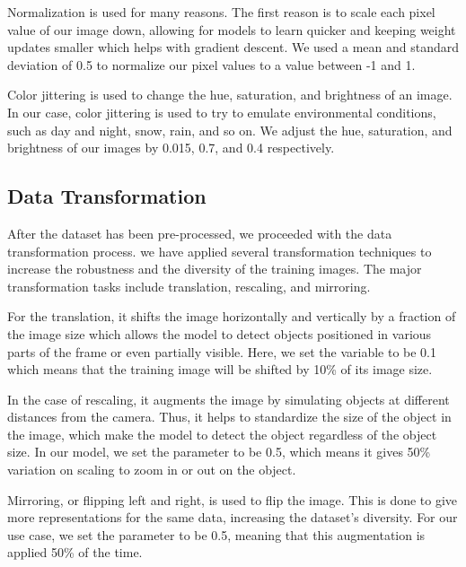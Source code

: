 \documentclass[stu,12pt,floatsintext]{apa7}
\begin{document}
Normalization is used for many reasons. The first reason is to scale each pixel value of our image down, allowing for models to learn quicker and keeping weight updates smaller which helps with gradient descent. We used a mean and standard deviation of 0.5 to normalize our pixel values to a value between -1 and 1.

Color jittering is used to change the hue, saturation, and brightness of an image. In our case, color jittering is used to try to emulate environmental conditions, such as day and night, snow, rain, and so on. We adjust the hue, saturation, and brightness of our images by 0.015, 0.7, and 0.4 respectively.



\subsection{Data Transformation}
After the dataset has been pre-processed, we proceeded with the data transformation process. we have applied several transformation techniques to increase the robustness and the diversity of the training images. The major transformation tasks include translation, rescaling, and mirroring.

For the translation, it shifts the image horizontally and vertically by a fraction of the image size which allows the model to detect objects positioned in various parts of the frame or even partially visible. Here, we set the variable to be 0.1 which means that the training image will be shifted by 10\% of its image size.

In the case of rescaling, it augments the image by simulating objects at different distances from the camera. Thus, it helps to standardize the size of the object in the image, which make the model to detect the object regardless of the object size. In our model, we set the parameter to be 0.5, which means it gives 50\% variation on scaling to zoom in or out on the object.

Mirroring, or flipping left and right, is used to flip the image. This is done to give more representations for the same data, increasing the dataset's diversity. For our use case, we set the parameter to be 0.5, meaning that this augmentation is applied 50\% of the time.
\end{document}
